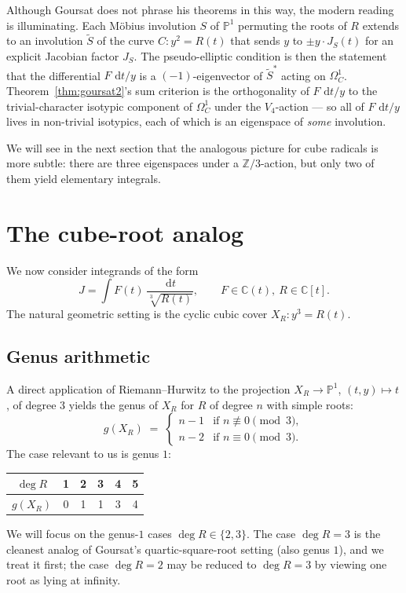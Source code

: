 \documentclass[11pt,a4paper]{article}
\theoremstyle{plain}
\theoremstyle{definition}
\theoremstyle{remark}
\newcommand{\C}{\mathbb{C}}
\newcommand{\Z}{\mathbb{Z}}
\renewcommand{\d}{\,\mathrm{d}}
\begin{document}
Although Goursat does not phrase his theorems in this way, the modern reading is illuminating. Each M\"obius involution $S$ of $\mathbb{P}^1$ permuting the roots of $R$ extends to an involution $\widetilde{S}$ of the curve $C \colon y^2 = R(t)$ that sends $y$ to $\pm y \cdot J_S(t)$ for an explicit Jacobian factor $J_S$. The pseudo-elliptic condition is then the statement that the differential $F\,\d t/y$ is a $(-1)$-eigenvector of $\widetilde{S}^*$ acting on $\Omega^1_C$. Theorem~\ref{thm:goursat2}'s sum criterion is the orthogonality of $F\,\d t/y$ to the trivial-character isotypic component of $\Omega^1_C$ under the $V_4$-action --- so all of $F\,\d t/y$ lives in non-trivial isotypics, each of which is an eigenspace of \emph{some} involution.

We will see in the next section that the analogous picture for cube radicals is more subtle: there are three eigenspaces under a $\Z/3$-action, but only two of them yield elementary integrals.


\section{The cube-root analog}
\label{sec:cuberoot}

We now consider integrands of the form
\begin{equation}\label{eq:cuberoot-integrand}
  J = \int F(t)\,\frac{\d t}{\sqrt[3]{R(t)}}, \qquad F\in\C(t),\ R\in\C[t].
\end{equation}
The natural geometric setting is the cyclic cubic cover $X_R \colon y^3 = R(t)$.

\subsection{Genus arithmetic}

A direct application of Riemann--Hurwitz to the projection $X_R\to\mathbb{P}^1$, $(t,y)\mapsto t$, of degree $3$ yields the genus of $X_R$ for $R$ of degree $n$ with simple roots:
\[
  g(X_R) \;=\;
  \begin{cases}
    n-1 & \text{if } n\not\equiv 0\pmod 3, \\
    n-2 & \text{if } n\equiv 0\pmod 3.
  \end{cases}
\]
The case relevant to us is genus $1$:
\begin{center}
\begin{tabular}{c|ccccc}
  $\deg R$ & 1 & 2 & 3 & 4 & 5 \\\hline
  $g(X_R)$ & 0 & 1 & 1 & 3 & 4
\end{tabular}
\end{center}
We will focus on the genus-$1$ cases $\deg R\in\{2,3\}$. The case $\deg R=3$ is the cleanest analog of Goursat's quartic-square-root setting (also genus $1$), and we treat it first; the case $\deg R = 2$ may be reduced to $\deg R = 3$ by viewing one root as lying at infinity.
\end{document}
